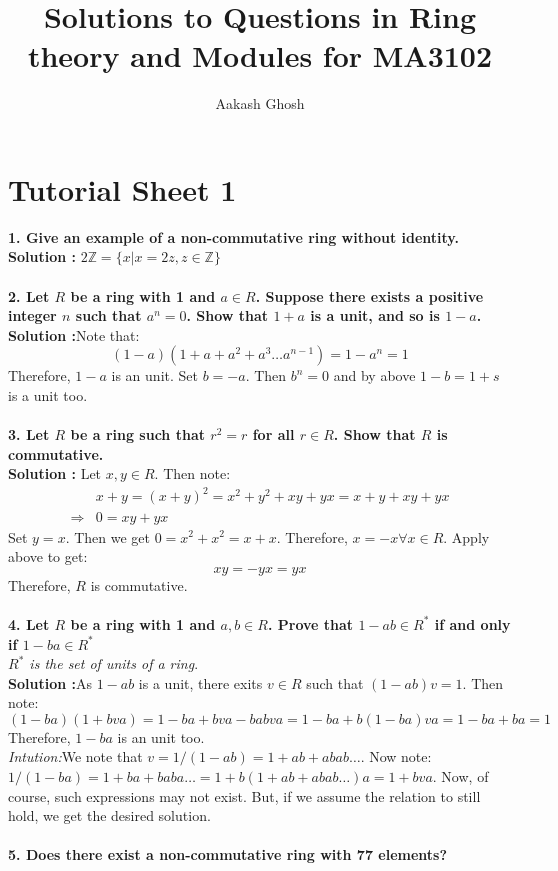 \documentclass[oneside]{book}
\title{Solutions to Questions in Ring theory and Modules for MA3102}
\author{Aakash Ghosh }
\begin{document}
\maketitle
\tableofcontents

\chapter{Tutorial Sheet 1}
\textbf{1. Give an example of a non-commutative ring without identity.}\\
\textbf{Solution :} $2\mathbb{Z}=\{x|x=2z,z\in\mathbb{Z}\}$\\\\
\textbf{2. Let $R$ be a ring with 1 and $a \in R$. Suppose there exists a positive integer $n$ such that $a^n = 0$. Show that $1 + a$ is a unit, and so is $1 - a$.}\\
\textbf{Solution :}Note that:
$$(1-a)(1+a+a^2+a^3\hdots a^{n-1})=1-a^n=1$$
Therefore, $1-a$ is an unit. Set $b=-a$. Then $b^n=0$ and by above $1-b=1+s$ is a unit too.\\\\
\textbf{3. Let $R$ be a ring such that $r^2 = r$ for all $r \in R$. Show that $R$ is commutative.}\\
\textbf{Solution :} Let $x,y\in R$. Then note:
\begin{align*}
    &x+y=(x+y)^2=x^2+y^2+xy+yx=x+y+xy+yx\\
    \Rightarrow &0=xy+yx
\end{align*}
Set $y=x$. Then we get $0=x^2+x^2=x+x$. Therefore, $x=-x\forall x\in R$. Apply above to get: $$xy=-yx=yx$$
Therefore, $R$ is commutative.\\\\
\textbf{4. Let $R$ be a ring with 1 and $a, b \in R$. Prove that $1 - ab \in R^*$ if and only if
$1 - ba \in R^*$}\\
\textit{$R^*$ is the set of units of a ring}.\\
\textbf{Solution :}As $1-ab$ is a unit, there exits $v\in R$ such that $(1-ab)v=1$. Then note:
$$(1-ba)(1+bva)=1-ba+bva-babva=1-ba+b(1-ba)va=1-ba+ba=1$$
Therefore, $1-ba$ is an unit too.\\
\textit{Intution:}We note that $v=1/(1-ab)=1+ab+abab\hdots$. Now note: $1/(1-ba)=1+ba+baba\hdots=1+b(1+ab+abab\hdots)a=1+bva$. Now, of course, such expressions may not exist. But, if we assume the relation to still hold, we get the desired solution.\\\\
\textbf{5. Does there exist a non-commutative ring with 77 elements?}\\
\end{document}

